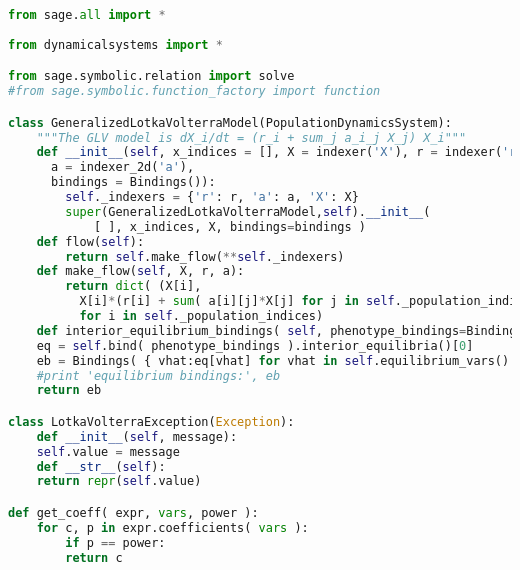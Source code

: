\begin{lstlisting}[language=Python]
from sage.all import *
 
from dynamicalsystems import *

from sage.symbolic.relation import solve
#from sage.symbolic.function_factory import function

class GeneralizedLotkaVolterraModel(PopulationDynamicsSystem):
    """The GLV model is dX_i/dt = (r_i + sum_j a_i_j X_j) X_i"""
    def __init__(self, x_indices = [], X = indexer('X'), r = indexer('r'),
      a = indexer_2d('a'),
      bindings = Bindings()):
        self._indexers = {'r': r, 'a': a, 'X': X}
        super(GeneralizedLotkaVolterraModel,self).__init__(
            [ ], x_indices, X, bindings=bindings )
    def flow(self):
        return self.make_flow(**self._indexers)
    def make_flow(self, X, r, a):
        return dict( (X[i],
          X[i]*(r[i] + sum( a[i][j]*X[j] for j in self._population_indices )))
          for i in self._population_indices)
    def interior_equilibrium_bindings( self, phenotype_bindings=Bindings() ):
	eq = self.bind( phenotype_bindings ).interior_equilibria()[0]
	eb = Bindings( { vhat:eq[vhat] for vhat in self.equilibrium_vars() } )
	#print 'equilibrium bindings:', eb
	return eb

class LotkaVolterraException(Exception):
    def __init__(self, message):
	self.value = message
    def __str__(self):
	return repr(self.value)

def get_coeff( expr, vars, power ):
    for c, p in expr.coefficients( vars ):
        if p == power:
	    return c


\end{lstlisting}
